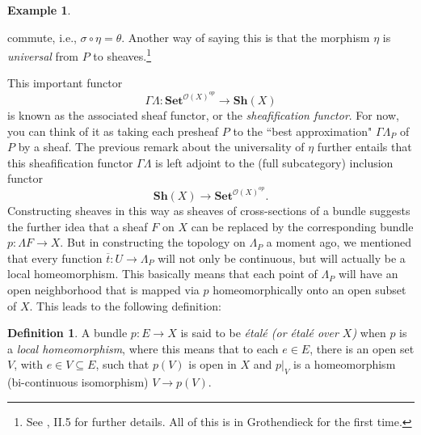 \documentclass[11pt]{book}
\theoremstyle{definition}
\newtheorem{example}{Example}[section]
\theoremstyle{definition}
\newtheorem{definition}{Definition}[section]
\theoremstyle{definition}
\theoremstyle{theorem}
\theoremstyle{definition}
\begin{document}
\begin{example}
\begin{center}
\end{center} 
commute, i.e., $\sigma \circ \eta = \theta$. Another way of saying this is that the morphism $\eta$ is \textit{universal} from $P$ to sheaves.\footnote{See \cite{maclane_sheaves_1994}, II.5 for further details. All of this is in Grothendieck for the first time.} \par 
This important functor 
	\begin{equation}
	\Gamma \Lambda: \textbf{Set}^{\mathscr{O}(X)^{op}} \rightarrow \textbf{Sh}(X)
	\end{equation} 
	is known as the associated sheaf functor, or the \textit{sheafification functor}. For now, you can think of it as taking each presheaf $P$ to the ``best approximation" $\Gamma \Lambda_P$ of $P$ by a sheaf. The previous remark about the universality of $\eta$ further entails that this sheafification functor $\Gamma \Lambda$ is left adjoint to the (full subcategory) inclusion functor 
	\begin{equation*}
	\textbf{Sh}(X) \rightarrow \textbf{Set}^{\mathscr{O}(X)^{op}}. 
	\end{equation*}
	Constructing sheaves in this way as sheaves of cross-sections of a bundle suggests the further idea that a sheaf $F$ on $X$ can be replaced by the corresponding bundle $p: \Lambda F \rightarrow X$. But in constructing the topology on $\Lambda_P$ a moment ago, we mentioned that every function $\overline{t}: U \rightarrow \Lambda_P$ will not only be continuous, but will actually be a local homeomorphism. This basically means that each point of $\Lambda_P$ will have an open neighborhood that is mapped via $p$ homeomorphically onto an open subset of $X$. This leads to the following definition: 
	\begin{definition}
		A bundle $p: E \rightarrow X$ is said to be \textit{\'etal\'e (or \'etal\'e over $X$)} when $p$ is a \textit{local homeomorphism}, where this means that to each $e \in E$, there is an open set $V$, with $e \in V \subseteq E$, such that $p(V)$ is open in $X$ and $p|_V$ is a homeomorphism (bi-continuous isomorphism) $V \rightarrow p(V)$.
	\end{definition} \noindent 

\end{example}
\end{document}
